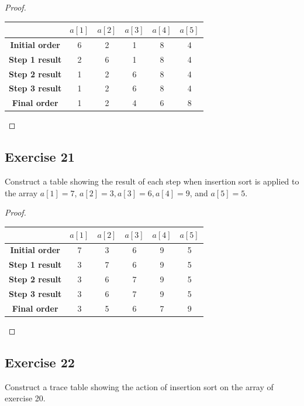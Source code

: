 \documentclass[14pt]{extarticle}
\begin{document}
\begin{proof}
\begin{center}
\begin{tabular}{|c|c|c|c|c|c|}
\hline
& \(a[1]\) & \(a[2]\) & \(a[3]\) & \(a[4]\) & \(a[5]\) \\
\hline
{\bf Initial order} &6&2&1&8&4 \\
\hline
{\bf Step 1 result} &2&6&1&8&4 \\
\hline
{\bf Step 2 result} &1&2&6&8&4 \\
\hline
{\bf Step 3 result} &1&2&6&8&4 \\
\hline
{\bf Final order} &1&2&4&6&8 \\
\hline
\end{tabular}
\end{center}
\end{proof}

\subsection{Exercise 21}
Construct a table showing the result of each step when insertion sort is applied to the array \(a[1] = 7\), 
\(a[2] = 3, a[3] = 6, a[4] = 9\), and \(a[5] = 5\).

\begin{proof}
\begin{center}
\begin{tabular}{|c|c|c|c|c|c|}
\hline
& \(a[1]\) & \(a[2]\) & \(a[3]\) & \(a[4]\) & \(a[5]\) \\
\hline
{\bf Initial order} &7&3&6&9&5 \\
\hline
{\bf Step 1 result} &3&7&6&9&5 \\
\hline
{\bf Step 2 result} &3&6&7&9&5 \\
\hline
{\bf Step 3 result} &3&6&7&9&5 \\
\hline
{\bf Final order} &3&5&6&7&9 \\
\hline
\end{tabular}
\end{center}
\end{proof}

\subsection{Exercise 22}
Construct a trace table showing the action of insertion sort on the array of exercise 20.
\end{document}
